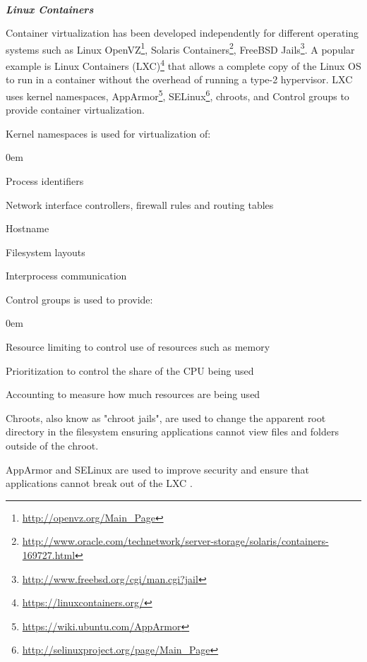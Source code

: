 \documentclass[a4paper,11pt,twoside]{report}
\begin{document}

\noindent
\\\textbf{\textit{Linux Containers}}

\noindent
Container virtualization has been developed independently for different operating systems such as Linux OpenVZ\footnote{\url{http://openvz.org/Main_Page}}, Solaris Containers\footnote{\url{http://www.oracle.com/technetwork/server-storage/solaris/containers-169727.html}}, FreeBSD Jails\footnote{\url{http://www.freebsd.org/cgi/man.cgi?jail}}. A popular example is Linux Containers (LXC)\footnote{\label{LCX} \url{https://linuxcontainers.org/}} that allows a complete copy of the Linux OS to run in a container without the overhead of running a type-2 hypervisor. LXC uses kernel namespaces, AppArmor\footnote{\url{https://wiki.ubuntu.com/AppArmor}}, SELinux\footnote{\url{http://selinuxproject.org/page/Main_Page}}, chroots, and Control groups to provide container virtualization. 

\noindent
Kernel namespaces is used for virtualization of:

\begin{list}{-}{}
  \itemsep0em
  \item Process identifiers
  \item Network interface controllers, firewall rules and routing tables
  \item Hostname
  \item Filesystem layouts 
  \item Interprocess communication
  \end{list}

\noindent 
Control groups is used to provide:

\begin{list}{-}{}
  \itemsep0em
  \item Resource limiting to control use of resources such as memory
  \item Prioritization to control the share of the CPU being used
  \item Accounting to measure how much resources are being used
  \end{list}

\noindent
Chroots, also know as "chroot jails", are used to change the apparent root directory in the filesystem ensuring applications cannot view files and folders outside of the chroot.

AppArmor and SELinux are used to improve security and ensure that applications cannot break out of the LXC \cite{security}.
\end{document}
